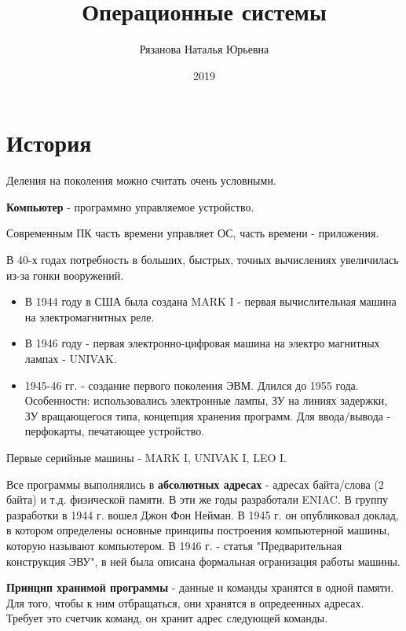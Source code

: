 \documentclass[a4paper, 14pt]{report}
\author{Рязанова Наталья Юрьевна}
\title{Операционные системы}
\date{2019}
\begin{document}
    \maketitle

    \tableofcontents
    \clearpage

    \chapter{История}

    Деления на поколения можно считать очень условными.

    \textbf{Компьютер} - программно управляемое устройство.

    Современным ПК часть времени управляет ОС, часть времени - приложения.

    В 40-х годах потребность в больших, быстрых, точных вычислениях увеличилась из-за гонки вооружений.

    \begin{itemize}

        \item В 1944 году в США была создана MARK I - первая вычислительная машина на электромагнитных реле.

        \item В 1946 году - первая электронно-цифровая машина на электро магнитных лампах - UNIVAK.

        \item 1945-46 гг. - создание первого поколения ЭВМ. Длился до 1955 года. Особенности: использовались электронные лампы, ЗУ на линиях задержки, ЗУ вращающегося типа, концепция хранения программ. Для ввода/вывода - перфокарты, печатающее устройство.
    \end{itemize}

    Первые серийные машины - MARK I, UNIVAK I, LEO I.

    Все программы выполнялись в \textbf{абсолютных адресах} - адресах байта/слова (2 байта) и т.д. физической памяти. В эти же годы разработали ENIAC. В группу разработки в 1944 г. вошел Джон Фон Нейман. В 1945 г. он опубликовал доклад, в котором определены основные принципы построения компьютерной машины, которую называют компьютером. В 1946 г. - статья "Предварительная конструкция ЭВУ", в ней была описана формальная огранизация работы машины.

    \textbf{Принцип хранимой программы} - данные и команды хранятся в одной памяти. Для того, чтобы к ним отбращаться, они хранятся в опредеенных адресах. Требует это счетчик команд, он хранит адрес следующей команды.
\end{document}
